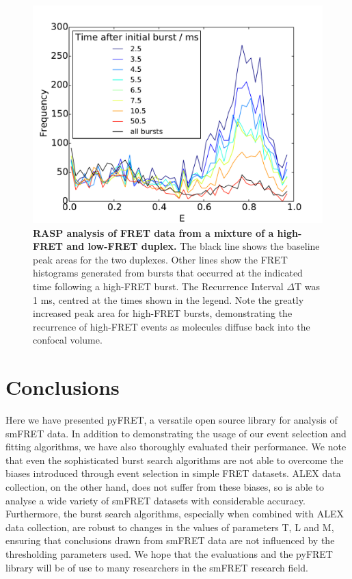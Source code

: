 \begin{figure}[!ht]
   \begin{center}
      \includegraphics*[clip=true, width=6in]{pyFRET/RASP_performance.pdf}
      \caption{{\bf RASP analysis of FRET data from a mixture of a high-FRET and low-FRET duplex.} The black line shows the baseline peak areas for the two duplexes. Other lines show the FRET histograms generated from bursts that occurred at the indicated time following a high-FRET burst. The Recurrence Interval $\Delta$T was 1 ms, centred at the times shown in the legend. Note the greatly increased peak area for high-FRET bursts, demonstrating the recurrence of high-FRET events as molecules diffuse back into the confocal volume.}
      \label{fig:fig9_RASP}
   \end{center}
\end{figure}

\section{Conclusions}
Here we have presented pyFRET, a versatile open source library for analysis of smFRET data. In addition to demonstrating the usage of our event selection and fitting algorithms, we have also thoroughly evaluated their performance. We note that even the sophisticated burst search algorithms are not able to overcome the biases introduced through event selection in simple FRET datasets. ALEX data collection, on the other hand, does not suffer from these biases, so is able to analyse a wide variety of smFRET datasets with considerable accuracy. Furthermore, the burst search algorithms, especially when combined with ALEX data collection, are robust to changes in the values of parameters T, L and M, ensuring that conclusions drawn from smFRET data are not influenced by the thresholding parameters used. We hope that the evaluations and the pyFRET library will be of use to many researchers in the smFRET research field. 
 
